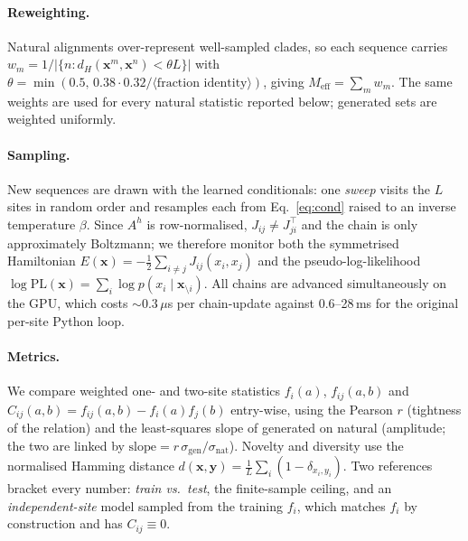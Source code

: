 \documentclass[10pt,twocolumn,a4paper]{article}
\begin{document}
\paragraph{Reweighting.} Natural alignments over-represent well-sampled clades, so each sequence
carries $w_m=1/|\{n: d_H(\bm x^m,\bm x^n)<\theta L\}|$ with
$\theta=\min(0.5,\,0.38\cdot0.32/\langle\text{fraction identity}\rangle)$, giving
$M_\text{eff}=\sum_m w_m$. The same weights are used for every natural statistic reported below;
generated sets are weighted uniformly.

\paragraph{Sampling.} New sequences are drawn with the learned conditionals: one \emph{sweep}
visits the $L$ sites in random order and resamples each from Eq.~\eqref{eq:cond} raised to an
inverse temperature $\beta$. Since $A^h$ is row-normalised, $J_{ij}\neq J_{ji}^\top$ and the chain
is only approximately Boltzmann; we therefore monitor both the symmetrised Hamiltonian
$E(\bm x)=-\frac12\sum_{i\neq j}J_{ij}(x_i,x_j)$ and the pseudo-log-likelihood
$\log\mathrm{PL}(\bm x)=\sum_i\log p(x_i\mid\bm x_{\setminus i})$. All chains are advanced
simultaneously on the GPU, which costs ${\sim}0.3\,\mu$s per chain-update against
0.6--28\,ms for the original per-site Python loop.

\paragraph{Metrics.} We compare weighted one- and two-site statistics
$f_i(a)$, $f_{ij}(a,b)$ and $C_{ij}(a,b)=f_{ij}(a,b)-f_i(a)f_j(b)$ entry-wise, using the Pearson
$r$ (tightness of the relation) and the least-squares slope of generated on natural (amplitude;
the two are linked by $\text{slope}=r\,\sigma_\text{gen}/\sigma_\text{nat}$). Novelty and diversity
use the normalised Hamming distance $d(\bm x,\bm y)=\frac1L\sum_i(1-\delta_{x_i,y_i})$.
Two references bracket every number: \emph{train vs.\ test}, the finite-sample ceiling, and an
\emph{independent-site} model sampled from the training $f_i$, which matches $f_i$ by construction
and has $C_{ij}\equiv0$.
\end{document}
